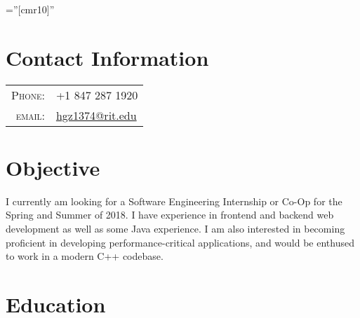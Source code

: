 \documentclass[a4paper,10pt]{article} %
\begin{document}
\pagestyle{empty} %

\font\fb=''[cmr10]'' %


\par{\par} %

\section{Contact Information}

\begin{tabular}{rl}
\textsc{Phone:} & +1 847 287 1920\\
\textsc{email:} & \href{mailto:hgz1374@rit.edu}{hgz1374@rit.edu}
\end{tabular}

\section{Objective}
    I currently am looking for a Software Engineering Internship or Co-Op for the Spring and Summer of 2018.
    I have experience in frontend and backend web development as well as some Java experience.
    I am also interested in becoming proficient in developing performance-critical applications, and would be enthused to work in a modern C++ codebase.


\section{Education}
\end{document}
